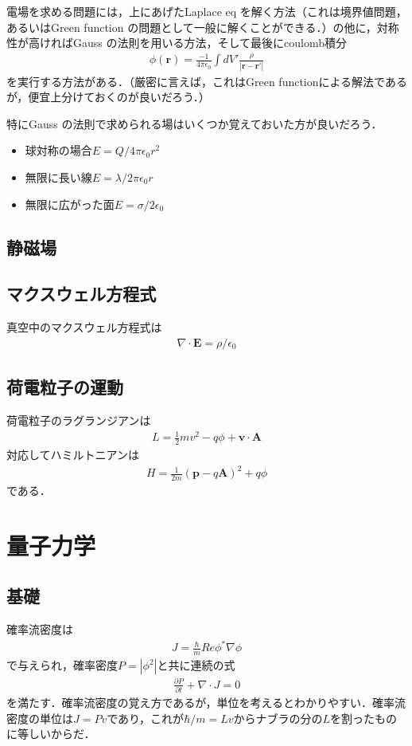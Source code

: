 \documentclass[a4j]{jarticle}
\begin{document}
電場を求める問題には，上にあげたLaplace eq を解く方法（これは境界値問題，あるいはGreen function の問題として一般に解くことができる．）の他に，対称性が高ければGauss の法則を用いる方法，そして最後にcoulomb積分
\begin{align*}
 \phi({\bm r})=\frac{-1}{4\pi\epsilon_0}\int dV' \frac{\rho}{|{\bm r}-{\bm r'}|}
\end{align*}
を実行する方法がある．（厳密に言えば，これはGreen functionによる解法であるが，便宜上分けておくのが良いだろう．）

特にGauss の法則で求められる場はいくつか覚えておいた方が良いだろう．

\begin{itemize}
 \item 球対称の場合$E=Q/4\pi\epsilon_0 r^2$
 \item 無限に長い線$E=\lambda /2\pi\epsilon_0 r$
 \item 無限に広がった面$E=\sigma /2\epsilon_0$
\end{itemize}

  \subsection{静磁場}



  
\subsection{マクスウェル方程式}
真空中のマクスウェル方程式は
\begin{align*}
 \nabla\cdot\bm{E}=\rho /\epsilon_0
\end{align*}
\subsection{荷電粒子の運動}
荷電粒子のラグランジアンは
\begin{align*}
 L=\frac{1}{2}mv^2-q\phi +\bm{v}\cdot \bm{A}
\end{align*}
対応してハミルトニアンは
\begin{align*}
 H=\frac{1}{2m}\left(\bm{p}-q\bm{A}\right)^2+q\phi
\end{align*}
である．




\section{量子力学}
\subsection{基礎}
確率流密度は
\begin{align*}
 J=\frac{\hbar}{m}Re\phi^{\ast}\nabla\phi
\end{align*}
で与えられ，確率密度$P=|\phi^2|$と共に連続の式
\begin{align*}
 \frac{\partial P}{\partial t}+\nabla\cdot J=0
\end{align*}
を満たす．確率流密度の覚え方であるが，単位を考えるとわかりやすい．確率流密度の単位は$J=Pv$であり，これが$\hbar/m=Lv$からナブラの分の$L$を割ったものに等しいからだ．
\end{document}
